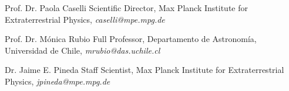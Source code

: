 

\begin{cvhonors}
	\cvhonor
	{Prof. Dr. Paola Caselli} %
	{Scientific Director, Max Planck Institute for Extraterrestrial Physics, \textit{caselli@mpe.mpg.de}} %
	{} %
	{} %
	
	\cvhonor
	{Prof. Dr. M\'onica Rubio} %
	{Full Professor, Departamento de Astronom\'ia, Universidad de Chile, \textit{mrubio@das.uchile.cl}} %
	{} %
	{} %
	
	\cvhonor
	{Dr. Jaime E. Pineda} %
	{Staff Scientist, Max Planck Institute for Extraterrestrial Physics, \textit{jpineda@mpe.mpg.de}} %
	{} %
	{} %
\end{cvhonors}